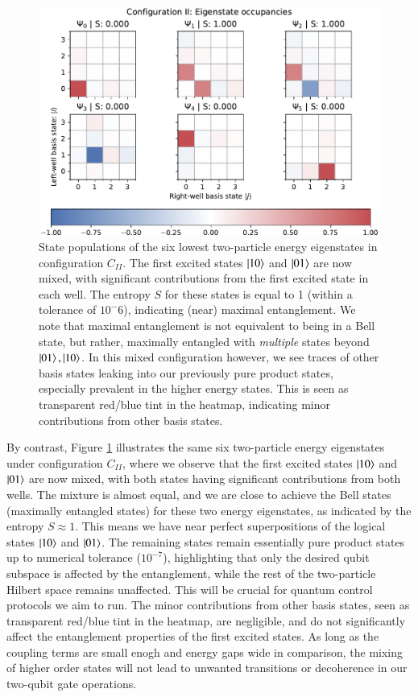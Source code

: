 \documentclass{subfiles}
\begin{document}
\begin{figure}[h!]
  \centering
  \includegraphics[width=\textwidth]{figs/state_populations_II.pdf}
  \caption{State populations of the six lowest two-particle energy eigenstates in configuration $C_{II}$. The first excited states $\ket{10}$ and $\ket{01}$ are now mixed, with significant contributions from the first excited state in each well. The entropy $S$ for these states is equal to 1 (within a tolerance of $10^-6$), indicating (near) maximal entanglement. We note that maximal entanglement is not equivalent to being in a Bell state, but rather, maximally entangled with \emph{multiple} states beyond $\ket{01}, \ket{10}$. In this mixed configuration however, we see traces of other basis states leaking into our previously pure product states, especially prevalent in the higher energy states. This is seen as transparent red/blue tint in the heatmap, indicating minor contributions from other basis states.}
  \label{fig:populations_II}
\end{figure}

By contrast, Figure \ref{fig:populations_II} illustrates the same six two-particle energy eigenstates under configuration $C_{II}$, where we observe that the first excited states $\ket{10}$ and $\ket{01}$ are now mixed, with both states having significant contributions from both wells. The mixture is almost equal, and we are close to achieve the Bell states (maximally entangled states) for these two energy eigenstates, as indicated by the entropy $S \approx 1$. This means we have near perfect superpositions of the logical states $\ket{10}$ and $\ket{01}$. The remaining states remain essentially pure product states up to numerical tolerance ($10^{-7}$), highlighting that only the desired qubit subspace is affected by the entanglement, while the rest of the two-particle Hilbert space remains unaffected. This will be crucial for quantum control protocols we aim to run. The minor contributions from other basis states, seen as transparent red/blue tint in the heatmap, are negligible, and do not significantly affect the entanglement properties of the first excited states. As long as the coupling terms are small enogh and energy gaps wide in comparison, the mixing of higher order states will not lead to unwanted transitions or decoherence in our two-qubit gate operations.
\\
\end{document}
